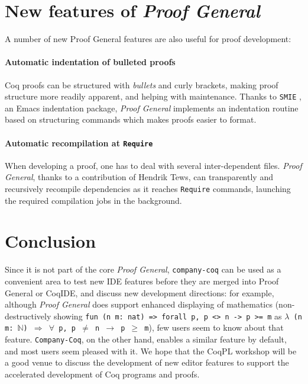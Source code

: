\documentclass[preprint]{sigplanconf}
\newcommand{\proofg}{\emph{Proof General}\xspace}
\begin{document}
\section*{New features of \proofg}

A number of new Proof General features are also useful for proof development:

\paragraph{Automatic indentation of bulleted proofs} Coq proofs can be structured with \emph{bullets} and curly brackets, making proof structure more readily apparent, and helping with maintenance. Thanks to \texttt{SMIE} \cite{SMIE}, an Emacs indentation package, \proofg implements an indentation routine based on structuring commands which makes proofs easier to format.

\paragraph{Automatic recompilation at \texttt{Require}} When developing a proof, one has to deal with several inter-dependent files. \proofg, thanks to a contribution of Hendrik Tews, can transparently and recursively recompile dependencies as it reaches \texttt{Require} commands, launching the required compilation jobs in the background.


\section*{Conclusion}
Since it is not part of the core \emph{Proof General}, \texttt{company-coq} can be used as a convenient area to test new IDE features before they are merged into Proof General or CoqIDE, and discuss new development directions: for example, although \emph{Proof General} does support enhanced displaying of mathematics (non-destructively showing \texttt{fun (n m: nat) => forall p, p <> n -> p >= m} as \texttt{$\lambda$ (n m: $\mathbb N$) $\Rightarrow$ $\forall$ p, p $\neq$ n $\rightarrow$ p $\geq$ m}), few users seem to know about that feature. \texttt{Company-Coq}, on the other hand, enables a similar feature by default, and most users seem pleased with it. We hope that the CoqPL workshop will be a good venue to discuss the development of new editor features to support the accelerated development of Coq programs and proofs.



\end{document}
